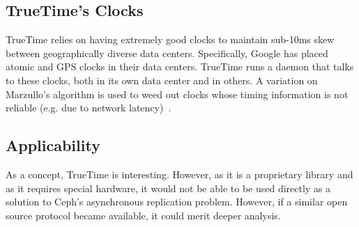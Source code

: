 \subsection{TrueTime's Clocks}

TrueTime relies on having extremely good clocks to maintain sub-10ms
skew between geographically diverse data centers. Specifically, Google
has placed atomic and GPS clocks in their data centers. TrueTime runs
a daemon that talks to these clocks, both in its own data center and
in others. A variation on Marzullo's algorithm is used to weed out
clocks whose timing information is not reliable (e.g. due to network
latency)~\citep{Corbett2012}.

\subsection{Applicability}

As a concept, TrueTime is interesting. However, as it is a proprietary
library and as it requires special hardware, it would not be able to
be used directly as a solution to Ceph's asynchronous replication
problem. However, if a similar open source protocol became available,
it could merit deeper analysis. %
